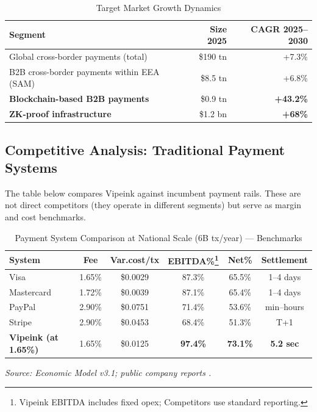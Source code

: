 \documentclass[11pt,a4paper]{article}
\newcommand{\tablesource}[1]{%
\par\vspace{3pt}%
{\footnotesize\color{gray!80}\textit{Source: #1}}%
\par\vspace{2pt}%
}
\begin{document}
\begin{table}[htbp]
\centering
\caption{Target Market Growth Dynamics}
\small
\begin{tabularx}{\linewidth}{@{}Lrr@{}}
\toprule
\textbf{Segment} & \textbf{Size 2025} & \textbf{CAGR 2025--2030} \\
\midrule
Global cross-border payments (total)~\cite{bis_crossborder,mckinsey_payments}               & \$190 tn   & +7.3\%  \\
B2B cross-border payments within EEA (SAM)~\cite{ecb_payments,capgemini_wpr}                & \$8.5 tn   & +6.8\%  \\
\textbf{Blockchain-based B2B payments}~\cite{mm_blockchain}             & \$0.9 tn   & \textbf{+43.2\%} \\
\textbf{ZK-proof infrastructure}~\cite{gvr_zkproof}                  & \$1.2 bn   & \textbf{+68\%}   \\
\bottomrule
\end{tabularx}
\end{table}

\subsection*{Competitive Analysis: Traditional Payment Systems}

The table below compares Vipeink against incumbent payment rails. These are not direct competitors (they operate in different segments) but serve as margin and cost benchmarks.

\begin{table}[htbp]
\centering
\caption{Payment System Comparison at National Scale (6B tx/year) --- Benchmarks}
\footnotesize
{}
\begin{tabularx}{\linewidth}{@{}lCCCCC@{}}
\toprule
\textbf{System} & \textbf{Fee} & \textbf{Var.cost/tx} & \textbf{EBITDA\%}\footnote{Vipeink EBITDA includes fixed opex; Competitors use standard reporting.} & \textbf{Net\%} & \textbf{Settlement} \\
\midrule
Visa~\cite{visa_ar}                    & 1.65\% & \$0.0029  & 87.3\% & 65.5\%                & 1--4 days \\
Mastercard~\cite{mc_ar}              & 1.72\% & \$0.0039  & 87.1\% & 65.4\%                & 1--4 days \\
PayPal~\cite{paypal_ar}                  & 2.90\% & \$0.0751  & 71.4\% & 53.6\%                & min--hours \\
Stripe~\cite{stripe_pricing,stripe_financial}                  & 2.90\% & \$0.0453  & 68.4\% & 51.3\%                & T+1 \\
\textbf{Vipeink (at 1.65\%)} & 1.65\% & \$0.0125  & \textbf{97.4\%} & \textbf{73.1\%} & \textbf{5.2 sec} \\
\bottomrule
\end{tabularx}
\tablesource{Economic Model v3.1; public company reports \cite{visa_ar,mc_ar,paypal_ar,stripe_pricing}.}
\end{table}
\end{document}
